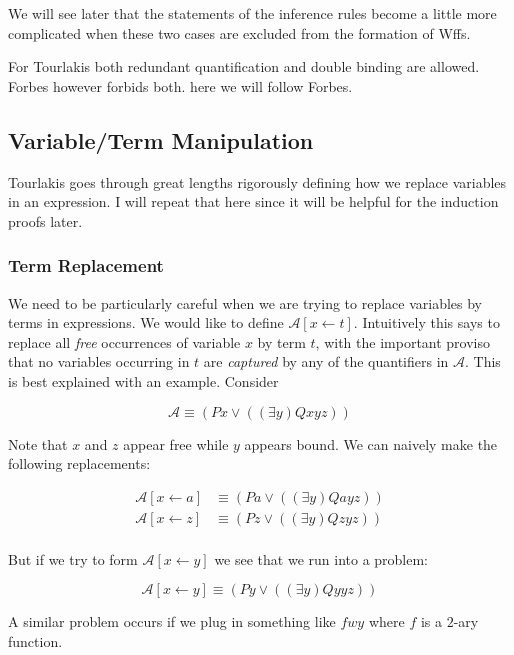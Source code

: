 \documentclass[12pt]{article}
\newcommand{\mc}[1]{\mathcal{#1}}
\begin{document}
We will see later that the statements of the inference rules become a little more complicated when these two cases are excluded from the formation of Wffs.

For Tourlakis both redundant quantification and double binding are allowed. Forbes however forbids both. here we will follow Forbes.

\subsection*{Variable/Term Manipulation}

Tourlakis goes through great lengths rigorously defining how we replace variables in an expression. I will repeat that here since it will be helpful for the induction proofs later.

\subsubsection*{Term Replacement}

We need to be particularly careful when we are trying to replace variables by terms in expressions. We would like to define $\mc{A}[x \leftarrow t]$. Intuitively this says to replace all \textit{free} occurrences of variable $x$ by term $t$, with the important proviso that no variables occurring in $t$ are \textit{captured} by any of the quantifiers in $\mc{A}$. This is best explained with an example. Consider

$$
\mc{A} \equiv (Px \lor ((\exists y)Qxyz))
$$

Note that $x$ and $z$ appear free while $y$ appears bound.
We can naively make the following replacements:

\begin{equation}
\begin{split}
\mc{A}[x\leftarrow a] &\equiv (Pa \lor ((\exists y)Qayz))\\
\mc{A}[x\leftarrow z] &\equiv (Pz \lor ((\exists y)Qzyz))\\
\end{split}
\end{equation}

But if we try to form $\mc{A}[x\leftarrow y]$ we see that we run into a problem:

\begin{equation}
\mc{A}[x\leftarrow y] \equiv (Py \lor ((\exists y)Qyyz))
\end{equation}

A similar problem occurs if we plug in something like $fwy$ where $f$ is a $2$-ary function.
\end{document}
